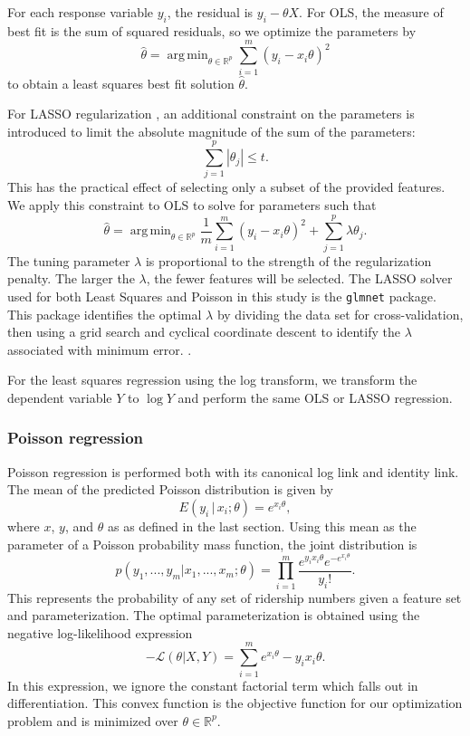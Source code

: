 \documentclass[11pt]{article}
\DeclareMathOperator*{\argmin}{arg\,min}
\begin{document}
For each response variable $y_i$, the residual is $y_i - \theta X$. For OLS, the measure of best fit is the sum of squared residuals, so we optimize the parameters by
\[\hat{\theta} = \argmin_{\theta\in\mathbb{R}^p}\sum_{i=1}^m \left(y_i - x_i\theta\right)^2\] to obtain a least squares best fit solution $\hat{\theta}$.

For LASSO regularization \cite{Tibshirani1996}, an additional constraint on the parameters is introduced to limit the absolute magnitude of the sum of the parameters: 
\[\sum_{j=1}^p |\theta_j|\leq t.\] This has the practical effect of selecting only a subset of the provided features. We apply this constraint to OLS to solve for parameters such that
\[\hat{\theta} = \argmin_{\theta\in\mathbb{R}^p} \frac{1}{m}\sum_{i=1}^m \left(y_i - x_i\theta\right)^2 + \sum_{j=1}^p\lambda\theta_j.\]
The tuning parameter $\lambda$ is proportional to the strength of the regularization penalty. The larger the $\lambda$, the fewer features will be selected. The LASSO solver used for both Least Squares and Poisson in this study is the \texttt{glmnet} package. This package identifies the optimal $\lambda$ by dividing the data set for cross-validation, then using a grid search and cyclical coordinate descent to identify the $\lambda$ associated with minimum error. .  

For the least squares regression using the log transform, we transform the dependent variable $Y$ to $\log{Y}$ and perform the same OLS or LASSO regression.

\subsubsection{Poisson regression} \label{sec:poiss}

Poisson regression is performed both with its canonical log link and identity link. The mean of the predicted Poisson distribution is given by 
\[E(y_i\,|\,x_i;\theta) = e^{x_i\theta},\]
where $x$, $y$, and $\theta$ as as defined in the last section. 
Using this mean as the parameter of a Poisson probability mass function, the joint distribution is
\[p(y_1, ..., y_m|x_1, ..., x_m; \theta) = \prod_{i=1}^m \frac{e^{y_ix_i\theta}e^{-e^{x_i\theta}}}{y_i!}.\]
This represents the probability of any set of ridership numbers given a feature set and parameterization. The optimal parameterization is obtained using the negative log-likelihood expression
\[-\mathcal{L}(\theta|X, Y) = \sum_{i=1}^m e^{x_i\theta}-y_ix_i\theta. \]
In this expression, we ignore the constant factorial term which falls out in differentiation. This convex function is the objective function for our optimization problem and is minimized over $\theta\in\mathbb{R}^p$.
\end{document}

